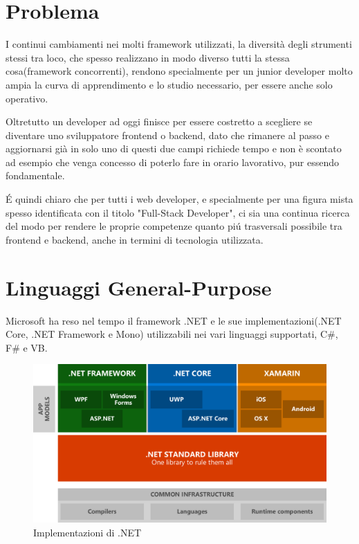 \section{Problema}\label{sez:problema}
I continui cambiamenti nei molti framework utilizzati, la diversit\`a degli strumenti stessi tra loco, che spesso realizzano in modo diverso tutti la stessa cosa(framework concorrenti), rendono specialmente per un junior developer molto ampia la curva di apprendimento e lo studio necessario, per essere anche solo operativo.

Oltretutto un developer ad oggi finisce per essere costretto a scegliere se diventare uno sviluppatore frontend o backend, dato che rimanere al passo e aggiornarsi gi\`a in solo uno di questi due campi richiede tempo e non \`e scontato ad esempio che venga concesso di poterlo fare in orario lavorativo, pur essendo fondamentale.

\'E quindi chiaro che per tutti i web developer, e specialmente per una figura mista spesso identificata con il titolo "Full-Stack Developer", ci sia una continua ricerca del modo per rendere le proprie competenze quanto pi\'u trasversali possibile tra frontend e backend, anche in termini di tecnologia utilizzata.

\section{Linguaggi General-Purpose}\label{sez:problema}
Microsoft ha reso nel tempo il framework .NET e le sue implementazioni(.NET Core, .NET Framework e Mono) utilizzabili nei vari linguaggi supportati, C\#, F\# e VB.
\begin{figure}[htbp]
	\centerline{\includegraphics[scale=0.3]{figure/DotNetImplementations}}
	\caption{Implementazioni di .NET}
	\label{fig:DotNetImplementations}
\end{figure}

